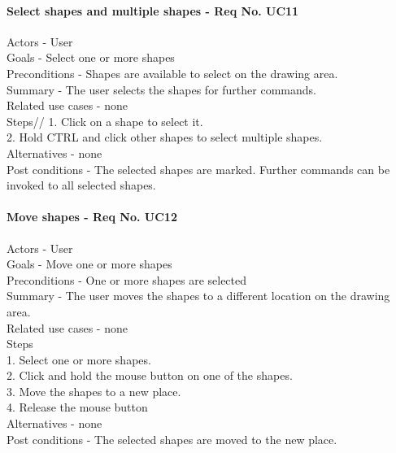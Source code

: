 \documentclass[twoside,letterpaper]{article}
\begin{document}
{\paragraph{Select shapes and multiple shapes - Req No. UC11\newline}
Actors - User\\
Goals - Select one or more shapes\\
Preconditions - Shapes are available to select on the drawing area. \\
Summary - The user selects the shapes for further commands.\\
Related use cases - none\\
Steps//
1. Click on a shape to select it.\\
2. Hold CTRL and click other shapes to select multiple shapes.\\
Alternatives - none\\
Post conditions - The selected shapes are marked. Further commands can be invoked to all selected shapes.\\

\paragraph{Move shapes - Req No. UC12\newline}
Actors - User\\
Goals - Move one or more shapes\\
Preconditions - One or more shapes are selected\\
Summary - The user moves the shapes to a different location on the drawing area.\\
Related use cases - none\\
Steps\\
1. Select one or more shapes.\\
2. Click and hold the mouse button on one of the shapes.\\
3. Move the shapes to a new place.\\
4. Release the mouse button\\
Alternatives - none\\
Post conditions - The selected shapes are moved to the new place.\\

}
\end{document}

